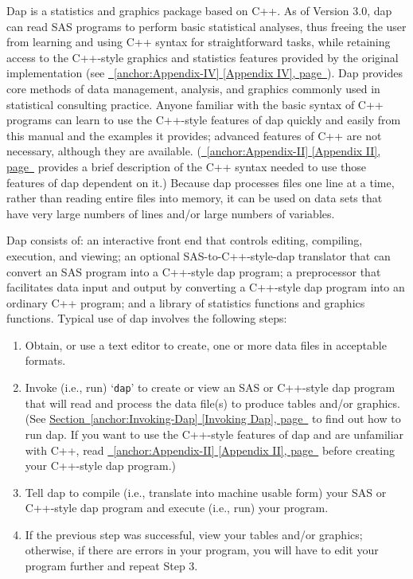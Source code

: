 \documentclass{book}
\renewcommand{\_}{\Texinfounderscore\discretionary{}{}{}}
\begin{document}
Dap is a statistics and graphics package based on C++.
As of Version 3.0, dap can read SAS programs to perform basic statistical
analyses, thus freeing the user from learning and using C++ syntax
for straightforward tasks,
while retaining access to the C++-style graphics and statistics
features provided by the original implementation (see \hyperref[anchor:Appendix-IV]{\chaptername~\ref*{anchor:Appendix-IV} [Appendix IV], page~\pageref*{anchor:Appendix-IV}}).
Dap provides core methods of data management,
analysis, and graphics commonly used in statistical
consulting practice.
Anyone familiar with the basic syntax of C++
%
%
programs can learn to use the C++-style features of
dap quickly and easily from this manual and the examples it provides;
advanced features of C++ are not necessary,
although they are available.
(\hyperref[anchor:Appendix-II]{\chaptername~\ref*{anchor:Appendix-II} [Appendix II], page~\pageref*{anchor:Appendix-II}} provides a brief description of the C++ syntax needed to use
those features of dap dependent on it.)
Because dap processes files one line at a time, rather than reading entire files
into memory, it can be used on data sets that have very large numbers of lines
and/or large numbers of variables.

Dap consists of: an interactive front end that
controls editing, compiling, execution, and viewing;
an optional SAS-to-C++-style-dap translator that can convert an SAS program into
a C++-style dap program;
a preprocessor that facilitates data input and output by
converting a C++-style dap program into an ordinary C++ program; and a library of
statistics functions and graphics functions.
Typical use of dap involves the following steps:

\begin{enumerate}[start=1]
\item Obtain, or use a text editor to create, one or more data files in acceptable
formats.
\item Invoke (i.e., run) `\texttt{dap}' to create or view an SAS or C++-style
dap program that will read and process the data file(s) to
produce tables and/or graphics.
(See \hyperref[anchor:Invoking-Dap]{Section~\ref*{anchor:Invoking-Dap} [Invoking Dap], page~\pageref*{anchor:Invoking-Dap}} to find out how to run dap.
If you want to use the C++-style features of dap and
are unfamiliar with C++, read \hyperref[anchor:Appendix-II]{\chaptername~\ref*{anchor:Appendix-II} [Appendix II], page~\pageref*{anchor:Appendix-II}} before creating
your C++-style dap program.)
\item Tell dap to compile (i.e., translate into machine usable form) your SAS
or C++-style dap program and execute (i.e., run) your program.
\item If the previous step was successful, view your tables and/or
graphics; otherwise, if there are errors in your program, you will have to edit your program
further and repeat Step 3.
\end{enumerate}
\end{document}
